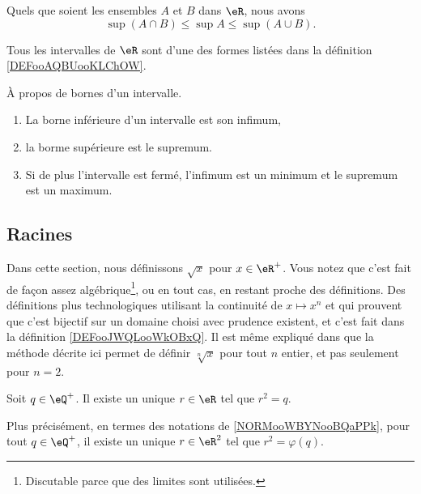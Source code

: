 \begin{proposition}     \label{PROPooANIOooIJHelX}
Quels que soient les ensembles $A$ et $B$ dans $\eR$, nous avons
\[
  \sup(A\cap B)\leq\sup A\leq\sup(A\cup B).
\]
\end{proposition}



\begin{proposition}     \label{PROPooHPMWooQJXCAS}
    Tous les intervalles de \( \eR\) sont d'une des formes listées dans la définition \ref{DEFooAQBUooKLChOW}.
\end{proposition}

\begin{lemma}       \label{LEMooWCUXooFqTwDK}
    À propos de bornes d'un intervalle.
    \begin{enumerate}
        \item
	        La borne inférieure d'un intervalle est son infimum, 
        \item
            la borme supérieure est le supremum. 
        \item
            Si de plus l'intervalle est fermé, l'infimum est un minimum et le supremum est un maximum.
    \end{enumerate}
\end{lemma}


\subsection{Racines}
\label{SUBSECooMBCNooEqjjTY}

Dans cette section, nous définissons \( \sqrt{ x }\) pour \( x\in\eR^+\). Vous notez que c'est fait de façon assez algébrique\footnote{Discutable parce que des limites sont utilisées.}, ou en tout cas, en restant proche des définitions. Des définitions plus technologiques utilisant la continuité de \( x\mapsto x^n\) et qui prouvent que c'est bijectif sur un domaine choisi avec prudence existent, et c'est fait dans la définition \ref{DEFooJWQLooWkOBxQ}. Il est même expliqué dans \cite{BIBooMPXEooQLKhku} que la méthode décrite ici permet de définir \( \sqrt[n]{ x }\) pour tout \( n\) entier, et pas seulement pour \( n=2\).

\begin{proposition}     \label{PROPooUHKFooVKmpte}
    Soit \( q\in \eQ^+\). Il existe un unique \( r\in \eR\) tel que \( r^2=q\).
    
    Plus précisément, en termes des notations de \ref{NORMooWBYNooBQaPPk}, pour tout \( q\in \eQ^+\), il existe un unique \( r\in \eR^2\) tel que \( r^2=\varphi(q)\).
\end{proposition}

